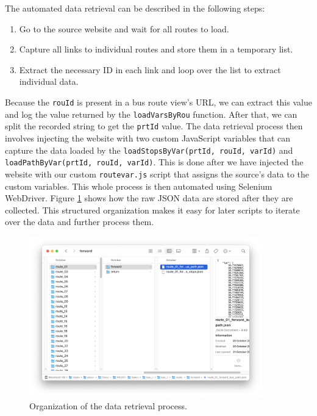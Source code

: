 The automated data retrieval can be described in the following steps:
\begin{enumerate}
    \item Go to the source website and wait for all routes to load.
    \item Capture all links to individual routes and store them in a temporary list.
    \item Extract the necessary ID in each link and loop over the list to extract individual data.
\end{enumerate}

Because the \lstinline{rouId} is present in a bus route view's URL, we can extract this value and log the value returned by the \lstinline{loadVarsByRou} function. After that, we can split the recorded string to get the \lstinline{prtId} value. The data retrieval process then involves injecting the website with two custom JavaScript variables that can capture the data loaded by the \lstinline{loadStopsByVar(prtId, rouId, varId)} and \lstinline{loadPathByVar(prtId, rouId, varId)}. This is done after we have injected the website with our custom \lstinline{routevar.js} script that assigns the source's data to the custom variables. This whole process is then automated using Selenium WebDriver. Figure \ref{fig:data_org} shows how the raw JSON data are stored after they are collected. This structured organization makes it easy for later scripts to iterate over the data and further process them.

\begin{figure}[H]
    \centering
    \includegraphics[width=0.9\textwidth]{assets/images/Implementation/data_org.png}
    \caption{Organization of the data retrieval process.}
    \label{fig:data_org}
\end{figure}

